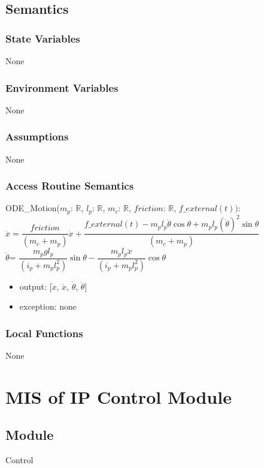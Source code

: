 \documentclass[12pt, titlepage]{article}
\begin{document}
\subsection{Semantics}

\subsubsection{State Variables}
None
\subsubsection{Environment Variables}
None
\subsubsection{Assumptions}
None
\subsubsection{Access Routine Semantics}




\noindent ODE\_Motion($ m_p$: $\mathbb{R}$, $l_p$: $\mathbb{R}$, $m_c$: $\mathbb{R}$, $friction$: $\mathbb{R}$, $f\_external(t))$:
\\

$\ddot{x} =\dfrac{ friction } {(m_c+m_p)}\dot{x}+ \dfrac{ f\_external(t)- m_pl_p\ddot{\theta}\cos{\theta}+ m_pl_p(\dot{\theta}) ^ 2 \sin{\theta}} {(m_c+m_p)}$\\

$\ddot{\theta}$= $\dfrac{m_pgl_p}{(i_p+m_pl_p^2)}\sin{\theta}-\dfrac{m_pl_p\ddot{x}}{(i_p+m_pl_p^2)}\cos{\theta}$\
\begin{itemize}
\item output:
[$\dot{x}$, $\ddot{x}$, $\dot{\theta}$, $\ddot{\theta}$]

\item exception: none
\end{itemize}

\subsubsection{Local Functions}
None




\newpage
\section{MIS of IP Control Module \label{MControl} }

\subsection{Module}
Control
\end{document}
